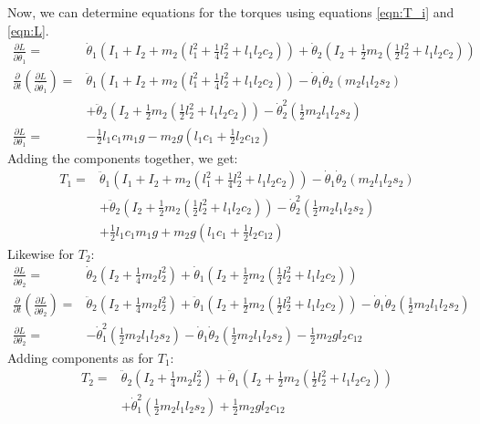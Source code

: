 Now, we can determine equations for the torques using equations \ref{eqn:T_i} and \ref{eqn:L}.
\begin{align*}
	\frac{\partial{L}}{\partial{\dot{\theta}_1}} =& \dot{\theta}_1\left(I_1 + I_2 + m_2 \left(l_1^2 + \frac{1}{4}l_2^2 + l_1 l_2 c_2 \right) \right) + \dot{\theta}_2 \left(I_2 + \frac{1}{2}m_2 \left(\frac{1}{2}l_2^2 + l_1 l_2 c_2 \right) \right) \\
	\frac{\partial}{\partial{t}}\left(\frac{\partial{L}}{\partial{\dot{\theta}_1}}\right) =& \ddot{\theta}_1 \left(I_1 + I_2 + m_2\left(l_1^2 + \frac{1}{4}l_2^2 + l_1 l_2 c_2 \right) \right) - \dot{\theta}_1 \dot{\theta}_2 \left(m_2 l_1 l_2 s_2 \right) \\
	&+ \ddot{\theta}_2 \left(I_2 + \frac{1}{2}m_2\left(\frac{1}{2}l_2^2 + l_1 l_2 c_2 \right)\right) - \dot{\theta}_2^2 \left( \frac{1}{2} m_2 l_1 l_2 s_2 \right) \\
	\frac{\partial{L}}{\partial{\theta_1}} =& -\frac{1}{2}l_1 c_1 m_1 g - m_2 g \left(l_1 c_1 + \frac{1}{2}l_2 c_{12} \right)
\end{align*}
Adding the components together, we get:
\begin{align}
	T_1 =& \ddot{\theta}_1 \left(I_1 + I_2 + m_2\left(l_1^2 + \frac{1}{4}l_2^2 + l_1 l_2 c_2 \right) \right) - \dot{\theta}_1 \dot{\theta}_2 \left(m_2 l_1 l_2 s_2 \right)\nonumber \\
	&+ \ddot{\theta}_2 \left(I_2 + \frac{1}{2}m_2\left(\frac{1}{2}l_2^2 + l_1 l_2 c_2 \right)\right) - \dot{\theta}_2^2 \left( \frac{1}{2} m_2 l_1 l_2 s_2 \right)\nonumber \\
	&+ \frac{1}{2}l_1 c_1 m_1 g + m_2 g \left(l_1 c_1 + \frac{1}{2}l_2 c_{12} \right)\label{eqn:T1}
\end{align}
Likewise for $T_2$:
\begin{align*}
	\frac{\partial{L}}{\partial{\dot{\theta}_2}} =& \dot{\theta}_2 \left(I_2 + \frac{1}{4}m_2 l_2^2 \right) + \dot{\theta}_1 \left(I_2 + \frac{1}{2}m_2 \left(\frac{1}{2}l_2^2 + l_1 l_2 c_2 \right) \right) \\
	\frac{\partial}{\partial{t}}\left(\frac{\partial{L}}{\partial{\dot{\theta}_2}}\right) =& \ddot{\theta}_2\left(I_2 + \frac{1}{4}m_2 l_2^2 \right) + \ddot{\theta}_1\left(I_2 + \frac{1}{2}m_2 \left(\frac{1}{2}l_2^2 + l_1 l_2 c_2 \right) \right) - \dot{\theta}_1 \dot{\theta}_2 \left(\frac{1}{2}m_2 l_1 l_2 s_2 \right) \\
	\frac{\partial{L}}{\partial{\theta_2}} =& - \dot{\theta}_1^2 \left(\frac{1}{2}m_2 l_1 l_2 s_2 \right) - \dot{\theta}_1\dot{\theta}_2 \left(\frac{1}{2} m_2 l_1 l_2 s_2 \right) - \frac{1}{2} m_2 g l_2 c_{12}
\end{align*}
Adding components as for $T_1$:
\begin{align}
	T_2 =& \ddot{\theta}_2\left(I_2 + \frac{1}{4}m_2 l_2^2 \right) + \ddot{\theta}_1\left(I_2 + \frac{1}{2}m_2 \left(\frac{1}{2}l_2^2 + l_1 l_2 c_2 \right) \right)\nonumber \\
	&+ \dot{\theta}_1^2 \left(\frac{1}{2}m_2 l_1 l_2 s_2 \right) + \frac{1}{2} m_2 g l_2 c_{12}\label{eqn:T2}
\end{align}

